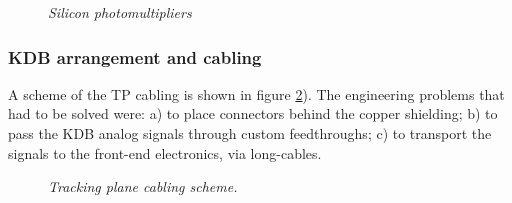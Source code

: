 \begin{figure}[hpt!]
  \centering
  \hspace{5mm}             
  \hspace{5mm}             
  \caption{\textit{Silicon photomultipliers}}
  \label{fig:sipm}
\end{figure}


\subsubsection*{KDB arrangement and cabling}
\label{sec:DB}

A scheme of the TP cabling is shown in 
figure \ref{fig:cabling:scheme}). The engineering problems that had to be solved were: a) to place connectors behind the copper shielding; b) to pass the KDB analog signals through custom feedthroughs; c) to transport the signals to the front-end electronics, via long-cables.  

\begin{figure}[hpt!]
    \bigskip
    \begin{center}\leavevmode
        \caption{\textit{Tracking plane cabling scheme.}}
        \label{fig:cabling:scheme}
    \end{center}
\end{figure}


